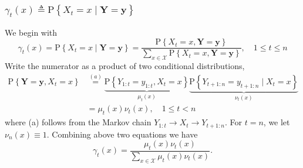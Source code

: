 \documentclass[11pt,a4paper]{article}
\begin{document}
\subsubsection{$\gamma_t(x) \triangleq \mathrm{P}\left\{X_t=x \mid \boldsymbol{Y}=\boldsymbol{y}\right\}$}
We begin with
$$
\gamma_t(x)=\mathrm{P}\left\{X_t=x \mid \boldsymbol{Y}=\boldsymbol{y}\right\}=\frac{\mathrm{P}\left\{X_t=x, \boldsymbol{Y}=\boldsymbol{y}\right\}}{\sum_{x \in \mathcal{X}} \mathrm{P}\left\{X_t=x, \boldsymbol{Y}=\boldsymbol{y}\right\}}, \quad 1 \leq t \leq n
$$
Write the numerator as a product of two conditional distributions,
$$
\begin{aligned}
\mathrm{P}\left\{\boldsymbol{Y}=\boldsymbol{y}, X_t=x\right\} & \stackrel{(a)}{=} \underbrace{\mathrm{P}\left\{Y_{1: t}=y_{1: t}, X_t=x\right\}}_{\mu_t(x)} \underbrace{\mathrm{P}\left\{Y_{t+1: n}=y_{t+1: n} \mid X_t=x\right\}}_{\nu_t(x)} \\
&=\mu_t(x) \nu_t(x), \quad 1 \leq t<n
\end{aligned}
$$
where (a) follows from the Markov chain $Y_{1: t} \rightarrow X_t \rightarrow Y_{t+1: n}$. For $t=n$, we let $\nu_n(x) \equiv 1$. Combining above two equations we have
$$
\gamma_t(x)=\frac{\mu_t(x) \nu_t(x)}{\sum_{x \in \mathcal{X}} \mu_t(x) \nu_t(x)} .
$$
\end{document}
